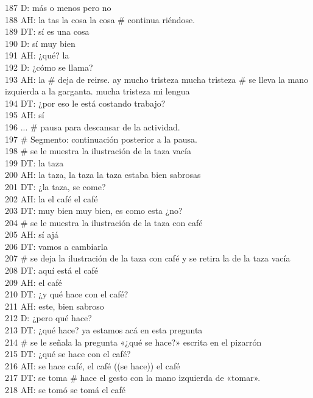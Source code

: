 187 D: más o menos pero no\\
188 AH: la tas la cosa la cosa \# continua riéndose.\\
189 DT: sí es una cosa\\
190 D: sí muy bien\\
191 AH: ¿qué? la\\
192 D: ¿cómo se llama?\\
193 AH: la \# deja de reirse. ay mucho tristeza mucha tristeza \# se lleva la mano izquierda a la garganta. mucha tristeza mi lengua\\
194 DT: ¿por eso le está costando trabajo?\\
195 AH: sí\\
196 ... \# pausa para descansar de la actividad.\\
197 # Segmento: continuación posterior a la pausa.\\
198 \# se le muestra la ilustración de la taza vacía\\
199 DT: la taza\\
200 AH: la taza, la taza la taza estaba bien sabrosas\\
201 DT: ¿la taza, se come?\\
202 AH: la el café el café\\
203 DT: muy bien muy bien, es como esta ¿no?\\
204 \# se le muestra la ilustración de la taza con café\\
205 AH: sí ajá\\
206 DT: vamos a cambiarla\\
207 \# se deja la ilustración de la taza con café y se retira la de la taza vacía\\
208 DT: aquí está el café\\
209 AH: el café\\
210 DT: ¿y qué hace con el café?\\
211 AH: este, bien sabroso\\
212 D: ¿pero qué hace?\\
213 DT: ¿qué hace? ya estamos acá en esta pregunta\\
214 \# se le señala la pregunta «¿qué se hace?» escrita en el pizarrón\\
215 DT: ¿qué se hace con el café?\\
216 AH: se hace café, el café ((se hace)) el café\\
217 DT: se toma \# hace el gesto con la mano izquierda de «tomar».\\
218 AH: se tomó se tomá el café\\
